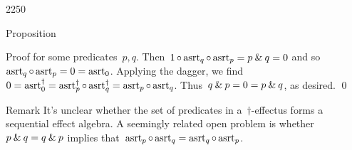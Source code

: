 \begin{parsec}{2250}
\begin{point}{60}{Proposition}
\begin{point}{70}{Proof}
    for some predicates~$p,q$.
    Then~$1 \mathop{\circ} \mathrm{asrt}_q \mathop{\circ} \mathrm{asrt}_p  = p \mathbin{\&} q= 0$
and so~$\mathrm{asrt}_q \mathop{\circ} \mathrm{asrt}_p = 0 = \mathrm{asrt}_0$.
Applying the dagger, we find
$0 = \mathrm{asrt}_0^\dagger = \mathrm{asrt}_p^\dagger \mathop{\circ} \mathrm{asrt}_q^\dagger
                = \mathrm{asrt}_p \mathop{\circ} \mathrm{asrt}_q$.
    Thus~$q \mathbin{\&} p = 0 = p \mathbin{\&} q$, as desired. \qed
\end{point}
\begin{point}{80}{Remark}%
It's unclear whether the set of predicates in a~$\dagger$-effectus
    forms a sequential effect algebra.
A seemingly related open problem
    is whether~$p \mathbin{\&} q = q \mathbin{\&} p$
    implies that~$\mathrm{asrt}_p \mathop{\circ} \mathrm{asrt}_q = \mathrm{asrt}_q \mathop{\circ} \mathrm{asrt}_p$.
\end{point}
\end{point}
\end{parsec}

